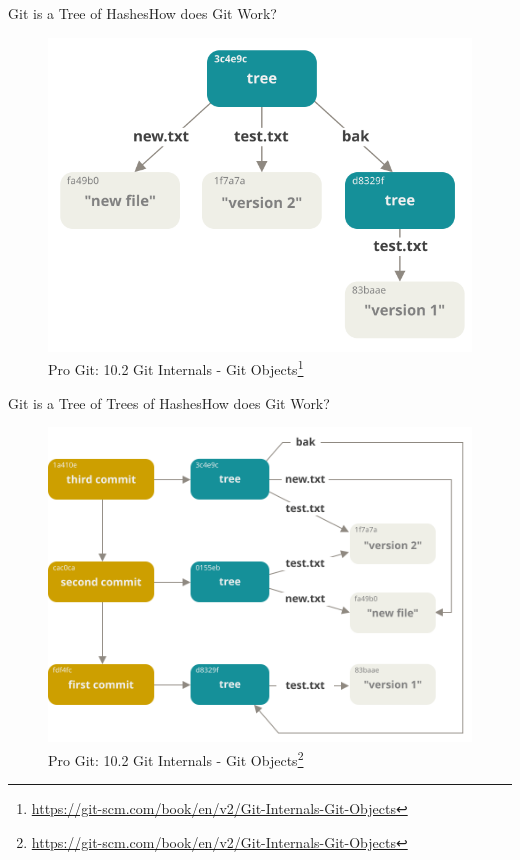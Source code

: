 \documentclass[aspectratio=169]{beamer}
\begin{document}
\begin{frame}{Git is a Tree of Hashes}{How does Git Work?}
\begin{figure}
    \centering
    \includegraphics[width=\textwidth,height=0.6\textheight,keepaspectratio]{data-model-2}
    \caption{
        Pro Git: 10.2 Git Internals - Git Objects\footnote{\url{https://git-scm.com/book/en/v2/Git-Internals-Git-Objects}}
    }
\end{figure}
\end{frame}

\begin{frame}{Git is a Tree of Trees of Hashes}{How does Git Work?}
\begin{figure}
    \centering
    \includegraphics[width=\textwidth,height=0.6\textheight,keepaspectratio]{data-model-3}
    \caption{
        Pro Git: 10.2 Git Internals - Git Objects\footnote{\url{https://git-scm.com/book/en/v2/Git-Internals-Git-Objects}}
    }
\end{figure}
\end{frame}
\end{document}
